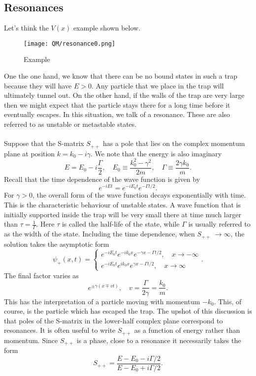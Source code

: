 \subsection{Resonances}
Let's think the $V(x)$ example shown below.
\begin{figure}[!h]
\centering
\texttt{[image: QM/resonance0.png]}
\caption{Example}
\end{figure} 
One the one hand, we know that there can be no bound states in such a trap because they will have $E > 0$. 
Any particle that we place in the trap will ultimately tunnel out. 
On the other hand, if the walls of the trap are very large then we might expect that the particle stays there for a long time before it eventually escapes. 
In this situation, we talk of a resonance. These are also referred to as unstable or metastable states.
\\ \\
Suppose that the S-matrix $S_{++}$ has a pole that lies on the complex momentum plane at position $k = k_0 - i\gamma$. We note that the energy is also imaginary
\[E = E_0 - i\frac{\Gamma}{2} , \quad E_0 \equiv \frac{k_0^2-\gamma^2}{2m} , \quad \Gamma \equiv \frac{2\gamma k_0}{m}.\]
Recall that the time dependence of the wave function is given by
\[e^{-iEt} = e^{-iE_0t}e^{-\Gamma t/2}.\]
For $\gamma > 0$, the overall form of the wave function decays exponentially with time. This is the characteristic behaviour of unstable states. 
A wave function that is initially supported inside the trap will be very small there at time much larger than $\tau = \frac{1}{\Gamma}$. Here $\tau$ is called the half-life of the state, while $\Gamma$ is usually referred to as the width of the state.
Including the time dependence, when $S_{++}\ \to \infty$, the solution takes the asymptotic form
\[\psi_+(x,t) = \begin{cases} e^{-iE_0t}e^{-ik_0x}e^{-\gamma x - \Gamma t/2} , \quad x\to -\infty \\  e^{-iE_0t}e^{ik_0x}e^{\gamma x - \Gamma t/2} , \quad x\to \infty \end{cases}.\]
The final factor varies as
\[e^{\pm\gamma(x\mp vt)} , \quad v = \frac{\Gamma}{2\gamma} = \frac{k_0}{m}.\]
This has the interpretation of a particle moving with momentum $-k_0$. This, of course, is the particle which has escaped the trap.
The upshot of this discussion is that poles of the S-matrix in the lower-half complex plane correspond to resonances. It is often useful to write $S_{++}$ as a function of energy rather than momentum. Since $S_{++}$ is a phase, close to a resonance it necessarily takes the form
\[S_{++} = \frac{E-E_0-i\Gamma/2}{E-E_0+i\Gamma/2}.\]



